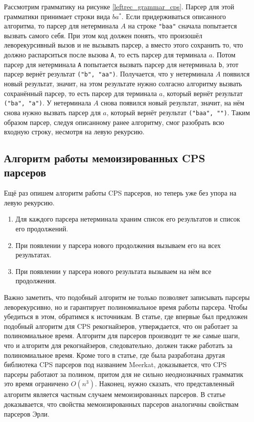 \documentclass[times]{itmo-student-thesis}
\begin{document}
Рассмотрим грамматику на рисунке \ref{leftrec_grammar_cps}. Парсер для этой грамматики принимает строки вида
$ba^*$. Если придерживаться описанного алгоритма, то парсер для нетерминала
$A$ на строке \lstinline{"baa"} сначала попытается вызвать самого себя. При этом код должен понять, что
произошёл леворекурсивный вызов и не вызывать парсер, а вместо этого сохранить то, что должно распарситься после вызова
\lstinline{A}, то есть парсер для терминала $a$. Потом парсер для нетерминала
\lstinline{A} попытается вызвать парсер для нетерминала \lstinline{b}, этот парсер вернёт результат
\lstinline{("b", "aa")}. Получается, что у нетерминала $A$ появился новый результат, значит, на этом
результате нужно солгасно алгоритму вызвать сохранённый парсер, то есть парсер для терминала $a$, который вернёт
результат \lstinline{("ba", "a")}. У нетерминала $A$ снова появился новый результат, значит, на нём снова
нужно вызвать парсер для $a$, который вернёт результат \lstinline{("baa", "")}. Таким образом парсер,
следуя описанному ранее алгоритму, смог разобрать всю входную строку, несмотря на левую рекурсию.

\subsection{Алгоритм работы мемоизированных CPS парсеров}

Ещё раз опишем алгоритм работы CPS парсеров, но теперь уже без упора на левую рекурсию.
\begin{enumerate}
    \item Для каждого парсера нетерминала храним список его результатов и список его продолжений.
    \item При появлении у парсера нового продолжения вызываем его на всех результатах.
    \item При появлении у парсера нового результата вызываем на нём все продолжения.
\end{enumerate}

Важно заметить, что подобный алгоритм не только позволяет записывать парсеры леворекурсивно, но и гарантирует
полиномиальное время работы парсера. Чтобы убедиться в этом, обратимся к источникам. В статье, где впервые был предложен подобный алгоритм для CPS
рекогнайзеров\cite{johnson_memoization_nodate}, утверждается, что он работает  за полиномиальное время. Алгоритм для парсеров
производит те же самые шаги, что и алгоритм для рекогнайзеров, следовательно,  должен также работать за полиномиальное
время. Кроме того в статье, где была разработана другая библиотека CPS парсеров под названием Meerkat\cite{johnson_memoization_nodate},  доказывается,
что CPS парсеры работают за полином, притом для не сильно неоднозначных грамматик это время ограничено
$O(n^3)$. Наконец, нужно сказать, что представленный алгоритм является частным случаем мемоизированных
парсеров. В статье \cite{norvig_techniques_1991} доказывается, что свойства мемоизированных парсеров аналогичны свойствам
парсеров Эрли.
\end{document}
